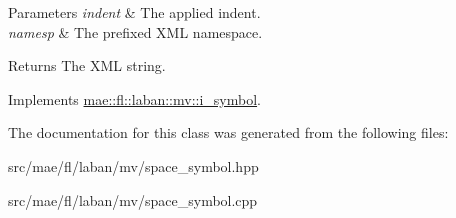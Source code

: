 \begin{DoxyParams}{Parameters}
{\em indent} & The applied indent. \\
\hline
{\em namesp} & The prefixed X\-M\-L namespace.\\
\hline
\end{DoxyParams}
\begin{DoxyReturn}{Returns}
The X\-M\-L string. 
\end{DoxyReturn}


Implements \hyperlink{classmae_1_1fl_1_1laban_1_1mv_1_1i__symbol_a05d0b0c74bad854d5e9e3291bbd87b0d}{mae\-::fl\-::laban\-::mv\-::i\-\_\-symbol}.



The documentation for this class was generated from the following files\-:\begin{DoxyCompactItemize}
\item 
src/mae/fl/laban/mv/space\-\_\-symbol.\-hpp\item 
src/mae/fl/laban/mv/space\-\_\-symbol.\-cpp\end{DoxyCompactItemize}
